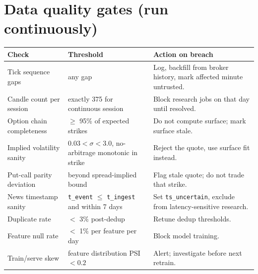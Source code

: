 \section{Data quality gates (run continuously)}

\begin{longtable}{@{}p{4.4cm}p{4.0cm}p{6.0cm}@{}}
\toprule
\textbf{Check} & \textbf{Threshold} & \textbf{Action on breach}\\
\midrule
Tick sequence gaps & any gap & Log, backfill from broker history, mark affected
minute untrusted.\\
Candle count per session & exactly 375 for continuous session & Block research
jobs on that day until resolved.\\
Option chain completeness & $\ge$ 95\% of expected strikes & Do not compute
surface; mark surface stale.\\
Implied volatility sanity & $0.03 < \sigma < 3.0$, no-arbitrage monotonic in
strike & Reject the quote, use surface fit instead.\\
Put-call parity deviation & beyond spread-implied bound & Flag stale quote; do
not trade that strike.\\
News timestamp sanity & \texttt{t\_event} $\le$ \texttt{t\_ingest} and within 7
days & Set \texttt{ts\_uncertain}, exclude from latency-sensitive research.\\
Duplicate rate & $<$ 3\% post-dedup & Retune dedup thresholds.\\
Feature null rate & $<$ 1\% per feature per day & Block model training.\\
Train/serve skew & feature distribution PSI $< 0.2$ & Alert; investigate before
next retrain.\\
\bottomrule
\end{longtable}
